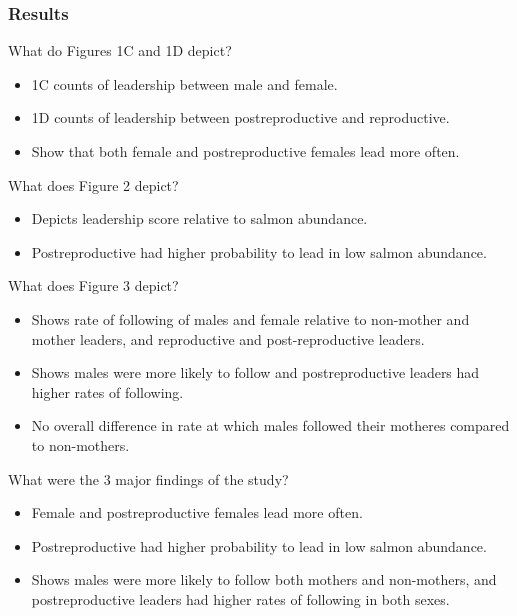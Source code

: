 \documentclass[12pt,a4paper]{article}
\begin{document}
\subsubsection{Results}
\begin{itemize}
    {\color{G-Moon}\item What do Figures 1C and 1D depict?}
        \begin{itemize}
            \item 1C counts of leadership between male and female.
            \item 1D counts of leadership between postreproductive and reproductive.
            \item Show that both female and postreproductive females lead more often.
        \end{itemize}
    {\color{G-Moon}\item What does Figure 2 depict?}
        \begin{itemize}
            \item Depicts leadership score relative to salmon abundance.
            \item Postreproductive had higher probability to lead in low salmon abundance.
        \end{itemize}
    {\color{G-Moon}\item What does Figure 3 depict?}
        \begin{itemize}
            \item Shows rate of following of males and female relative to non-mother and mother leaders, and reproductive and post-reproductive leaders.
            \item Shows males were more likely to follow and postreproductive leaders had higher rates of following.
            \item No overall difference in rate at which males followed their motheres compared to non-mothers.
        \end{itemize}
    {\color{G-Moon}\item What were the 3 major findings of the study?}
        \begin{itemize}
            \item Female and postreproductive females lead more often. 
            \item Postreproductive had higher probability to lead in low salmon abundance.
            \item Shows males were more likely to follow both mothers and non-mothers, and postreproductive leaders had higher rates of following in both sexes.
        \end{itemize}
\end{itemize}
\end{document}
